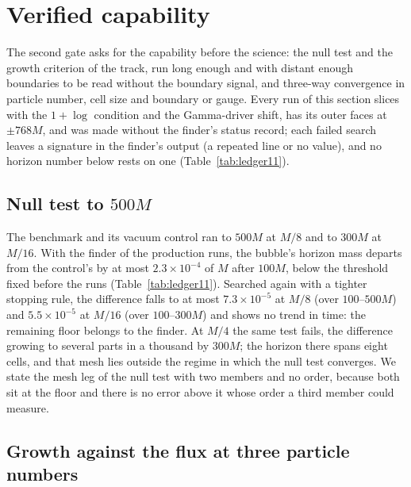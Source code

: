 \documentclass[aps,prd,twocolumn,10pt,superscriptaddress,nofootinbib,longbibliography,floatfix]{revtex4-2}
\begin{document}
\section{Verified capability}\label{sec:g2}

The second gate asks for the capability before the science: the null test and the growth criterion of the track, run long enough and with distant enough boundaries to be read without the boundary signal, and three-way convergence in particle number, cell size and boundary or gauge. Every run of this section slices with the $1+\log$ condition and the Gamma-driver shift, has its outer faces at $\pm768M$, and was made without the finder's status record; each failed search leaves a signature in the finder's output (a repeated line or no value), and no horizon number below rests on one (Table~\ref{tab:ledger11}).

\subsection{Null test to $500M$}

The benchmark and its vacuum control ran to $500M$ at $M/8$ and to $300M$ at $M/16$. With the finder of the production runs, the bubble's horizon mass departs from the control's by at most $2.3\times10^{-4}$ of $M$ after $100M$, below the threshold fixed before the runs (Table~\ref{tab:ledger11}). Searched again with a tighter stopping rule, the difference falls to at most $7.3\times10^{-5}$ at $M/8$ (over $100$--$500M$) and $5.5\times10^{-5}$ at $M/16$ (over $100$--$300M$) and shows no trend in time: the remaining floor belongs to the finder. At $M/4$ the same test fails, the difference growing to several parts in a thousand by $300M$; the horizon there spans eight cells, and that mesh lies outside the regime in which the null test converges. We state the mesh leg of the null test with two members and no order, because both sit at the floor and there is no error above it whose order a third member could measure.

\subsection{Growth against the flux at three particle numbers}
\end{document}

